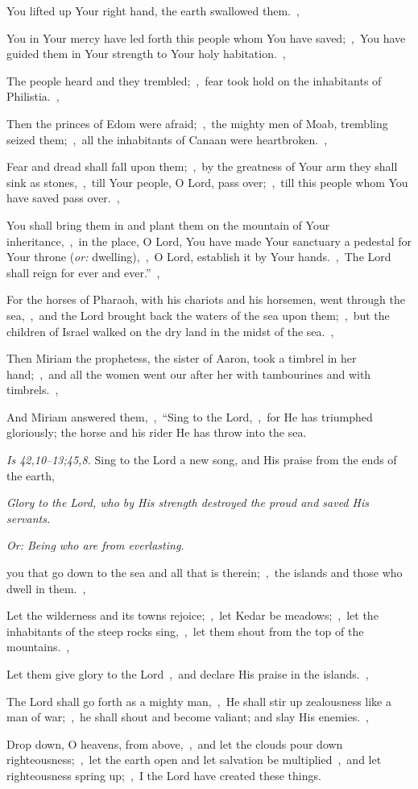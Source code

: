 \documentclass[12pt,twoside,a5paper]{article}
\newcommand{\qanona}[1]{{\liturgicalhint{Qanona.} \emph{#1}}}
\newcommand{\scripture}[1]{\emph{#1.}}
\newcommand{\translationoption}[1]{\emph{or:} #1}
\begin{document}
\begin{normalparskip}
  You lifted up Your right hand, the earth swallowed them.~\sep

  You in Your mercy have led forth this people whom You have saved;~\sep\ You have guided them in Your strength to Your holy habitation.~\sep

  The people heard and they trembled;~\sep\ fear took hold on the inhabitants of Philistia.~\sep

  Then the princes of Edom were afraid;~\sep\ the mighty men of Moab, trembling seized them;~\sep\ all the inhabitants of Canaan were heartbroken.~\sep

  Fear and dread shall fall upon them;~\sep\ by the greatness of Your arm they shall sink as stones,~\sep\ till Your people, O Lord, pass over;~\sep\ till this people whom You have saved pass over.~\sep

  You shall bring them in and plant them on the mountain of Your inheritance,~\sep\ in the place, O Lord, You have made Your sanctuary a pedestal for Your throne (\translationoption{dwelling}),~\sep\ O Lord, establish it by Your hands.~\sep\ The Lord shall reign for ever and ever.''~\sep

  For the horses of Pharaoh, with his chariots and his horsemen, went through the sea,~\sep\ and the Lord brought back the waters of the sea upon them;~\sep\ but the children of Israel walked on the dry land in the midst of the sea.~\sep

  Then Miriam the prophetess, the sister of Aaron, took a timbrel in her hand;~\sep\ and all the women went our after her with tambourines and with timbrels.~\sep

  And Miriam answered them,~\sep\ ``Sing to the Lord,~\sep\ for He has triumphed gloriously; the horse and his rider He has throw into the sea.
\end{normalparskip}

\begin{normalparskip}
  \scripture{Is 42,10--13;45,8} Sing to the Lord a new song, and His praise from the ends of the earth,

  \qanona{Glory to the Lord, who by His strength destroyed the proud and saved His servants.}

  \emph{Or: Being who are from everlasting.}

  you that go down to the sea and all that is therein;~\sep\ the islands and those who dwell in them.~\sep

  Let the wilderness and its towns rejoice;~\sep\ let Kedar be meadows;~\sep\ let the inhabitants of the steep rocks sing,~\sep\ let them shout from the top of the mountains.~\sep

  Let them give glory to the Lord~\sep\ and declare His praise in the islands.~\sep

  The Lord shall go forth as a mighty man,~\sep\ He shall stir up zealousness like a man of war;~\sep\ he shall shout and become valiant; and slay His enemies.~\sep

  Drop down, O heavens, from above,~\sep\ and let the clouds pour down righteousness;~\sep\ let the earth open and let salvation be multiplied~\sep\ and let righteousness spring up;~\sep\ I the Lord have created these things.
\end{normalparskip}
\end{document}
